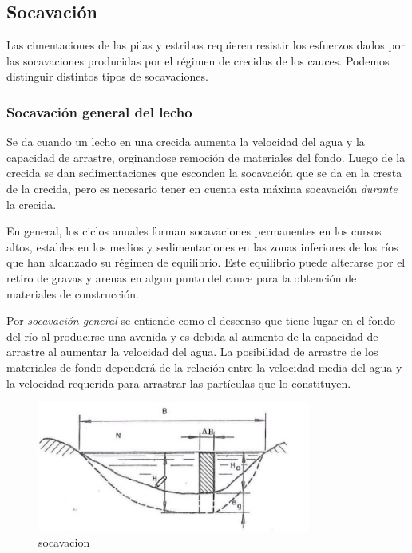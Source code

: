 \documentclass[../main.tex]{subfiles}
\begin{document}
\subsection{Socavación}

Las cimentaciones de las pilas y estribos requieren resistir los esfuerzos
dados por las socavaciones producidas por el régimen de crecidas de los cauces.
Podemos distinguir distintos tipos de socavaciones.

\subsubsection{Socavación general del lecho}

Se da cuando un lecho en una crecida aumenta la velocidad del agua y la capacidad
de arrastre, orginandose remoción de materiales del fondo. Luego de la 
crecida se dan sedimentaciones que esconden la socavación que se da en la cresta
de la crecida, pero es necesario tener en cuenta esta máxima socavación
\textit{durante} la crecida.

En general, los ciclos anuales forman socavaciones permanentes en los cursos
altos, estables en los medios y sedimentaciones en las zonas inferiores de los
ríos que han alcanzado su régimen de equilibrio. Este equilibrio puede alterarse
por el retiro de gravas y arenas en algun punto del cauce para la obtención
de materiales de construcción.

Por \textit{socavación general} se entiende como el descenso que tiene lugar
en el fondo del río al producirse una avenida y es debida al aumento de la
capacidad de arrastre al aumentar la velocidad del agua. La posibilidad de arrastre
de los materiales de fondo dependerá de la relación entre la velocidad media
del agua y la velocidad requerida para arrastrar las partículas que lo constituyen.

\begin{figure}[ht]
  \centering
  \includegraphics[width=0.8\textwidth]{../images/20210426/socavacion}
  \caption{socavacion}
  \label{fig:socavacion}
\end{figure}
\end{document}
